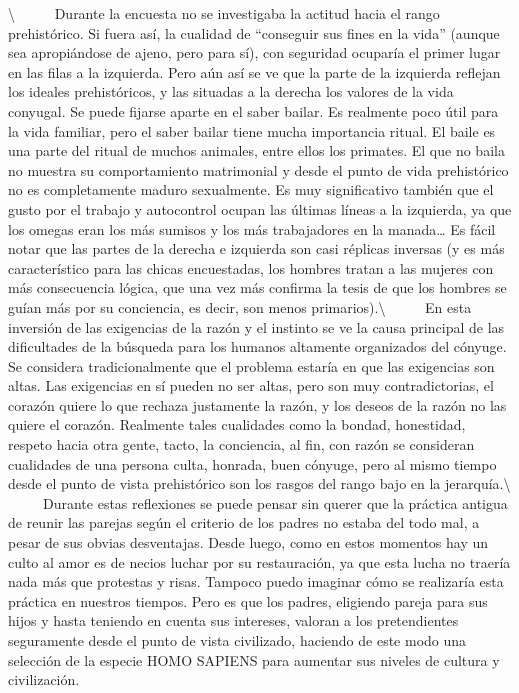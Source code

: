 \textbackslash{} ~ ~ ~ Durante la encuesta no se investigaba la actitud
hacia el rango prehistórico. Si fuera así, la cualidad de ``conseguir
sus fines en la vida'' (aunque sea apropiándose de ajeno, pero para sí),
con seguridad ocuparía el primer lugar en las filas a la izquierda. Pero
aún así se ve que la parte de la izquierda reflejan los ideales
prehistóricos, y las situadas a la derecha los valores de la vida
conyugal. Se puede fijarse aparte en el saber bailar. Es realmente poco
útil para la vida familiar, pero el saber bailar tiene mucha importancia
ritual. El baile es una parte del ritual de muchos animales, entre ellos
los primates. El que no baila no muestra su comportamiento matrimonial y
desde el punto de vida prehistórico no es completamente maduro
sexualmente. Es muy significativo también que el gusto por el trabajo y
autocontrol ocupan las últimas líneas a la izquierda, ya que los omegas
eran los más sumisos y los más trabajadores en la manada\ldots{} Es
fácil notar que las partes de la derecha e izquierda son casi réplicas
inversas (y es más característico para las chicas encuestadas, los
hombres tratan a las mujeres con más consecuencia lógica, que una vez
más confirma la tesis de que los hombres se guían más por su conciencia,
es decir, son menos primarios).\textbackslash{} ~ ~ ~ En esta inversión
de las exigencias de la razón y el instinto se ve la causa principal de
las dificultades de la búsqueda para los humanos altamente organizados
del cónyuge. Se considera tradicionalmente que el problema estaría en
que las exigencias son altas. Las exigencias en sí pueden no ser altas,
pero son muy contradictorias, el corazón quiere lo que rechaza
justamente la razón, y los deseos de la razón no las quiere el corazón.
Realmente tales cualidades como la bondad, honestidad, respeto hacia
otra gente, tacto, la conciencia, al fin, con razón se consideran
cualidades de una persona culta, honrada, buen cónyuge, pero al mismo
tiempo desde el punto de vista prehistórico son los rasgos del rango
bajo en la jerarquía.\textbackslash{} ~ ~ ~ Durante estas reflexiones se
puede pensar sin querer que la práctica antigua de reunir las parejas
según el criterio de los padres no estaba del todo mal, a pesar de sus
obvias desventajas. Desde luego, como en estos momentos hay un culto al
amor es de necios luchar por su restauración, ya que esta lucha no
traería nada más que protestas y risas. Tampoco puedo imaginar cómo se
realizaría esta práctica en nuestros tiempos. Pero es que los padres,
eligiendo pareja para sus hijos y hasta teniendo en cuenta sus
intereses, valoran a los pretendientes seguramente desde el punto de
vista civilizado, haciendo de este modo una selección de la especie HOMO
SAPIENS para aumentar sus niveles de cultura y civilización.

